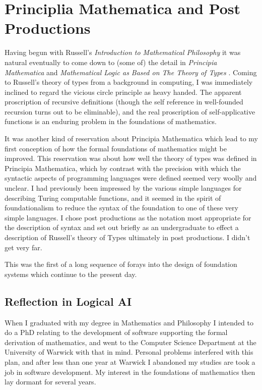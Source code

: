 \documentclass[10pt,titlepage]{book}
\begin{document}
\section{Principlia Mathematica and Post Productions}

Having begun with Russell's \emph{Introduction to Mathematical Philosophy} \cite{russell10} it was natural eventually to come down to (some of) the detail in \emph{Principia Mathematica} \cite{russell10} and \emph{Mathematical Logic as Based on The Theory of Types} \cite{russell1908}.
Coming to Russell's theory of types from a background in computing, I was immediately inclined to regard the vicious circle principle as heavy handed.
The apparent proscription of recursive definitions (though the self reference in well-founded recursion turns out to be eliminable), and the real proscription of self-applicative functions is an enduring problem in the foundations of mathematics.

It was another kind of reservation about Principia Mathematica which lead to my first conception of how the formal foundations of mathematics might be improved.
This reservation was about how well the theory of types was defined in Principia Mathematica, which by contrast with the precision with which the syntactic aspects of programming languages were defined seemed very woolly and unclear.
I had previously been impressed by the various simple languages for describing Turing computable functions, and it seemed in the spirit of foundationalism to reduce the syntax of the foundation to one of these very simple languages.
I chose post productions as the notation most appropriate for the description of syntax and set out briefly as an undergraduate to effect a description of Russell's theory of Types ultimately in post productions.
I didn't get very far.

This was the first of a long sequence of forays into the design of foundation systems which continue to the present day.

\subsection{Reflection in Logical AI}

When I graduated with my degree in Mathematics and Philosophy I intended to do a PhD relating to the development of software supporting the formal derivation of mathematics, and went to the Computer Science Department at the University of Warwick with that in mind.
Personal problems interfered with this plan, and after less than one year at Warwick I abandoned my studies are took a job in software development.
My interest in the foundations of mathematics then lay dormant for several years.
\end{document}
